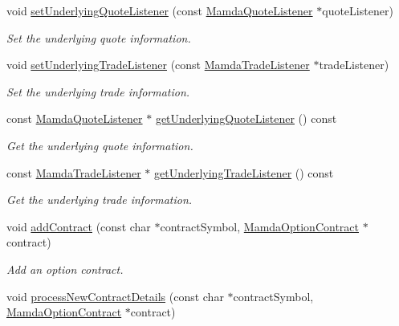 \begin{CompactItemize}
void \hyperlink{classWombat_1_1MamdaOptionChain_5a4d5775be29a6f0e63d40723c9f2a0e}{set\-Underlying\-Quote\-Listener} (const \hyperlink{classWombat_1_1MamdaQuoteListener}{Mamda\-Quote\-Listener} $\ast$quote\-Listener)
\begin{CompactList}\small\item\em Set the underlying quote information. \item\end{CompactList}\item 
void \hyperlink{classWombat_1_1MamdaOptionChain_5402589f97170ab7b23cdc6d6444043b}{set\-Underlying\-Trade\-Listener} (const \hyperlink{classWombat_1_1MamdaTradeListener}{Mamda\-Trade\-Listener} $\ast$trade\-Listener)
\begin{CompactList}\small\item\em Set the underlying trade information. \item\end{CompactList}\item 
const \hyperlink{classWombat_1_1MamdaQuoteListener}{Mamda\-Quote\-Listener} $\ast$ \hyperlink{classWombat_1_1MamdaOptionChain_0eaa6dd3566c4ef4307c111196b052a7}{get\-Underlying\-Quote\-Listener} () const 
\begin{CompactList}\small\item\em Get the underlying quote information. \item\end{CompactList}\item 
const \hyperlink{classWombat_1_1MamdaTradeListener}{Mamda\-Trade\-Listener} $\ast$ \hyperlink{classWombat_1_1MamdaOptionChain_0063439822d2ce9579359a364c4a08c7}{get\-Underlying\-Trade\-Listener} () const 
\begin{CompactList}\small\item\em Get the underlying trade information. \item\end{CompactList}\item 
void \hyperlink{classWombat_1_1MamdaOptionChain_bf155ef60b006915b493d70243e06640}{add\-Contract} (const char $\ast$contract\-Symbol, \hyperlink{classWombat_1_1MamdaOptionContract}{Mamda\-Option\-Contract} $\ast$contract)
\begin{CompactList}\small\item\em Add an option contract. \item\end{CompactList}\item 
void \hyperlink{classWombat_1_1MamdaOptionChain_5beee45c6d8385a030c99f114259657f}{process\-New\-Contract\-Details} (const char $\ast$contract\-Symbol, \hyperlink{classWombat_1_1MamdaOptionContract}{Mamda\-Option\-Contract} $\ast$contract)

\end{CompactItemize}
